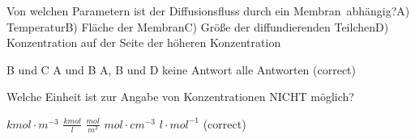 \documentclass[11pt]{exam}
\begin{document}
\begin{questions}
\vspace{3mm}\question Von welchen Parametern ist der Diffusionsfluss durch ein Membran abhängig?A) TemperaturB) Fläche der MembranC) Größe der diffundierenden TeilchenD) Konzentration auf der Seite der höheren Konzentration

\begin{choices}
	\choice B und C
	\choice A und B
	\choice A, B und D
	\choice keine Antwort
	\choice alle Antworten (correct)
\end{choices}

\vspace{3mm}\question Welche Einheit ist zur Angabe von Konzentrationen NICHT möglich?

\begin{choices}
	\choice \( kmol \cdot m^{-3} \)
	\choice \( \frac{kmol}{l} \)
	\choice \( \frac{mol}{m^3} \)
	\choice \( mol \cdot cm^{-3} \)
	\choice \( l \cdot mol^{-1} \) (correct)
\end{choices}

\vspace{3mm}\end{questions}
\end{document}
